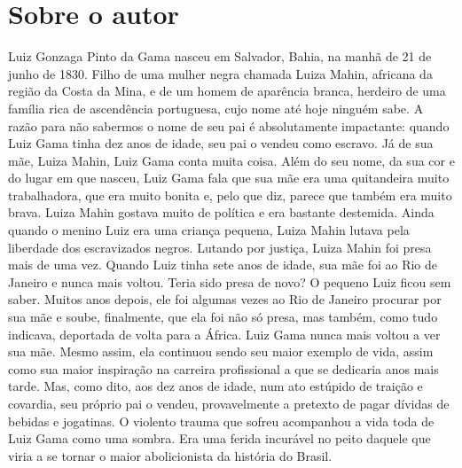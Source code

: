 
\section{Sobre o autor}

\noindent{}Luiz Gonzaga Pinto da Gama nasceu em Salvador, Bahia, na manhã
de 21 de junho de 1830. Filho de uma mulher negra chamada Luiza Mahin,
africana da região da Costa da Mina, e de um homem de aparência branca,
herdeiro de uma família rica de ascendência portuguesa, cujo nome até
hoje ninguém sabe. A razão para não sabermos o nome de seu pai é
absolutamente impactante: quando Luiz Gama tinha dez anos de idade, seu
pai o vendeu como escravo. Já de sua mãe, Luiza Mahin, Luiz Gama conta
muita coisa. Além do seu nome, da sua cor e do lugar em que nasceu, Luiz
Gama fala que sua mãe era uma quitandeira muito trabalhadora, que era
muito bonita e, pelo que diz, parece que também era muito brava. Luiza
Mahin gostava muito de política e era bastante destemida. Ainda quando o
menino Luiz era uma criança pequena, Luiza Mahin lutava pela liberdade
dos escravizados negros. Lutando por justiça, Luiza Mahin foi presa mais
de uma vez. Quando Luiz tinha sete anos de idade, sua mãe foi ao Rio de
Janeiro e nunca mais voltou. Teria sido presa de novo? O pequeno Luiz
ficou sem saber. Muitos anos depois, ele foi algumas vezes ao Rio de
Janeiro procurar por sua mãe e soube, finalmente, que ela foi não só
presa, mas também, como tudo indicava, deportada de volta para a África.
Luiz Gama nunca mais voltou a ver sua mãe. Mesmo assim, ela continuou
sendo seu maior exemplo de vida, assim como sua maior inspiração na
carreira profissional a que se dedicaria anos mais tarde. Mas, como
dito, aos dez anos de idade, num ato estúpido de traição e covardia, seu
próprio pai o vendeu, provavelmente a pretexto de pagar dívidas de
bebidas e jogatinas. O violento trauma que sofreu acompanhou a vida toda
de Luiz Gama como uma sombra. Era uma ferida incurável no peito daquele
que viria a se tornar o maior abolicionista da história do Brasil.

